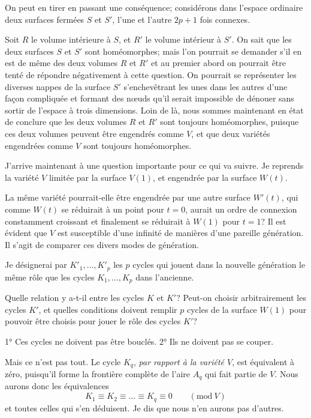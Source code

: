 \documentclass{article}
\begin{document}
On peut en tirer en passant une conséquence; considérons dans l'espace ordinaire deux surfaces fermées $S$ et $S'$, l'une et l'autre $2p + 1$ fois connexes.


Soit $R$ le volume intérieure à $S$, et $R'$ le volume intérieur à $S'$. On sait que les deux surfaces $S$ et $S'$ sont homéomorphes; mais l'on pourrait se demander s'il en est de même des deux volumes $R$ et $R'$ et au premier abord on pourrait être tenté de répondre négativement à cette question. On pourrait se représenter les diverses nappes de la surface $S'$ s'enchevêtrant les unes dans les autres d'une façon compliquée et formant des nœuds qu'il serait impossible de dénouer sans sortir de l'espace à trois dimensions. Loin de là, nous sommes maintenant en état de conclure que les deux volumes $R$ et $R'$ sont toujours homéomorphes, puisque ces deux volumes peuvent être engendrés comme $V$, et que deux variétés engendrées comme $V$ sont toujours homéomorphes.

J'arrive maintenant à une question importante pour ce qui va suivre. Je reprends la variété $V$ limitée par la surface $V(1)$, et engendrée par la surface $W(t)$.

La même variété pourrait-elle être engendrée par une autre surface $W'(t)$, qui comme $W(t)$ se réduirait à un point pour $t = 0$, aurait un ordre de connexion constamment croissant et finalement se réduirait à $W(1)$ pour $t = 1$? Il est évident que $V$ est susceptible d'une infinité de manières d'une pareille génération. Il s'agit de comparer ces divers modes de génération.

Je désignerai par $K'_{1}, \ldots, K'_{p}$ les $p$ cycles qui jouent dans la nouvelle génération le même rôle que les cycles $K_{1}, \ldots, K_{p}$ dans l'ancienne.

Quelle relation y a-t-il entre les cycles $K$ et $K'$? Peut-on choisir arbitrairement les cycles $K'$, et quelles conditions doivent remplir $p$ cycles de la surface $W(1)$ pour pouvoir être choisis pour jouer le rôle des cycles $K'$?

1° Ces cycles ne doivent pas être bouclés. 2° Ils ne doivent pas se couper.

Mais ce n'est pas tout. Le cycle $K_{q}$, \emph{par rapport à la variété $V$}, est équivalent à zéro, puisqu'il forme la frontière complète de l'aire $A_{q}$ qui fait partie de $V$. Nous aurons donc les équivalences
\[ K_{1} \equiv K_{2} \equiv \ldots \equiv K_{q} \equiv 0 \qquad (\text{mod}\ V) \tag{1} \]
et toutes celles qui s'en déduisent. Je dis que nous n'en aurons pas d'autres.
\end{document}
